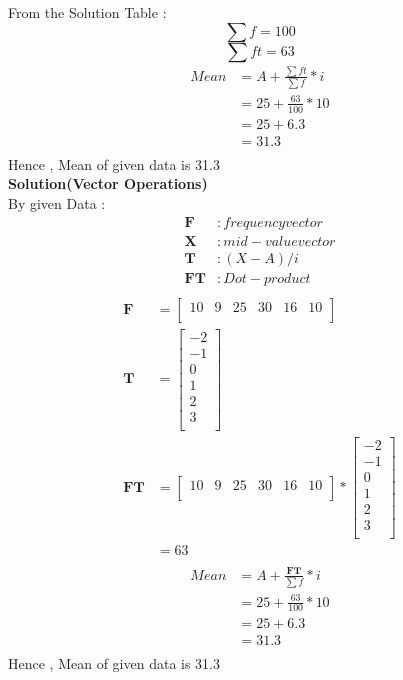 \documentclass[12pt, a4paper, twocolumn]{article}
\begin{document}
From the Solution Table :\\
\begin{equation*}
\sum f = 100
\end{equation*}
\begin{equation*}
\sum ft = 63
\end{equation*}
\begin{align*}
Mean & = A + \frac{ \sum ft }{\sum f} * i\\
     & = 25 + \frac{63}{100} * 10\\
     & = 25 + 6.3\\
     & = 31.3\\\
\end{align*}
Hence , Mean of given data is 31.3\\
\newpage
\textbf{Solution(Vector Operations)}\\
By given Data :\\
\begin{align*}
\textbf{F} & : frequency vector\\
\textbf{X} & : mid-value vector\\
\textbf{T} & : (X-A)/i\\
\textbf{FT}& : Dot-product\\
\end{align*}
\begin{align*}
\textbf{F} & = 
\begin{bmatrix}
10 & 9 & 25 & 30 & 16 & 10 \\
\end{bmatrix}\\
\textbf{T} & =
\begin{bmatrix}
-2 \\ -1 \\ 0 \\ 1 \\ 2 \\ 3 \\
\end{bmatrix}\\
\textbf{FT} & =
\begin{bmatrix}
10 & 9 & 25 & 30 & 16 & 10 \\
\end{bmatrix}
*
\begin{bmatrix}
-2 \\ -1 \\ 0 \\ 1 \\ 2 \\ 3 \\
\end{bmatrix}\\
 & = 63\\
\end{align*}
\begin{align*}
Mean & = A + \frac{ \textbf{FT} }{\sum f} * i\\
     & = 25 + \frac{63}{100} * 10\\
     & = 25 + 6.3\\
     & = 31.3\\\
\end{align*}
Hence , Mean of given data is 31.3\\
\end{document}
